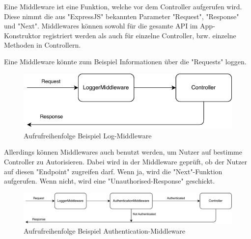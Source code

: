 
Eine Middleware ist eine Funktion, welche vor dem Controller aufgerufen wird. Diese nimmt die aus "ExpressJS" bekannten Parameter "Request", "Response" und "Next". Middlewares können sowohl für die gesamte API im App-Konstruktor registriert werden als auch für einzelne Controller, bzw. einzelne Methoden in Controllern.

Eine Middleware könnte zum Beispiel Informationen über die "Requests" loggen. 

\begin{figure}[h]
    \centering
    \includegraphics{media/APITemplate/LogMiddleware.svg.pdf}
    \caption{Aufrufreihenfolge Beispiel Log-Middleware} 
\end{figure}

Allerdings können Middlewares auch benutzt werden, um Nutzer auf bestimme Controller zu Autorisieren. Dabei wird in der Middleware geprüft, ob der Nutzer auf diesen "Endpoint" zugreifen darf. Wenn ja, wird die "Next"-Funktion aufgerufen. Wenn nicht, wird eine "Unauthorised-Response" geschickt.

\begin{figure}[h]
    \centering
    \includegraphics[width=15cm]{media/APITemplate/AuthMiddleware.svg.pdf}
    \caption{Aufrufreihenfolge Beispiel Authentication-Middleware} 
\end{figure}
